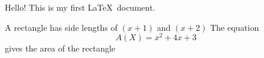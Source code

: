 \documentclass[11pt]{article}
\begin{document}
Hello! This is my first \LaTeX\ document.

A rectangle has side lengths of $(x+1)$ and $(x+2)$
The equation $${A(X)=x^2+4x+3}$$ gives the area of the rectangle
\end{document}
